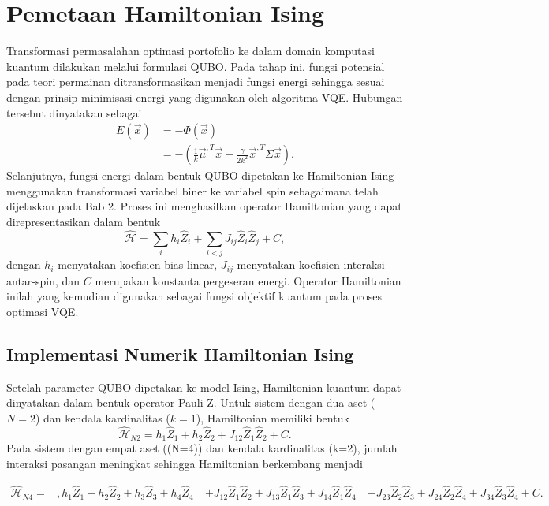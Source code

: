 \section{Pemetaan Hamiltonian Ising}
\label{sec:4_3_pemetaan_hamiltonian}
Transformasi permasalahan optimasi portofolio ke dalam domain komputasi kuantum dilakukan melalui formulasi QUBO. Pada tahap ini, fungsi potensial pada teori permainan ditransformasikan menjadi fungsi energi sehingga sesuai dengan prinsip minimisasi energi yang digunakan oleh algoritma VQE. Hubungan tersebut dinyatakan sebagai
\begin{equation}
\begin{split}
E(\vec{x})
&=
-\Phi(\vec{x}) \\
&=
-
\left(
\frac{1}{k}\vec{\mu}^{,T}\vec{x}
-
\frac{\gamma}{2k^2}
\vec{x}^{,T}\Sigma\vec{x}
\right).
\label{eq:energy_function}
\end{split}
\end{equation}
Selanjutnya, fungsi energi dalam bentuk QUBO dipetakan ke Hamiltonian Ising menggunakan transformasi variabel biner ke variabel spin sebagaimana telah dijelaskan pada Bab 2. Proses ini menghasilkan operator Hamiltonian yang dapat direpresentasikan dalam bentuk
\begin{equation}
\hat{\mathcal H}
=
\sum_i h_i \hat Z_i
+
\sum_{i<j} J_{ij}\hat Z_i\hat Z_j
+
C,
\end{equation}
dengan \(h_i\) menyatakan koefisien bias linear, \(J_{ij}\) menyatakan koefisien interaksi antar-spin, dan \(C\) merupakan konstanta pergeseran energi. Operator Hamiltonian inilah yang kemudian digunakan sebagai fungsi objektif kuantum pada proses optimasi VQE.

\subsection{Implementasi Numerik Hamiltonian Ising}
Setelah parameter QUBO dipetakan ke model Ising, Hamiltonian kuantum dapat dinyatakan dalam bentuk operator Pauli-Z. Untuk sistem dengan dua aset (\(N=2\)) dan kendala kardinalitas (\(k=1\)), Hamiltonian memiliki bentuk
\begin{equation}
\hat{\mathcal{H}}_{N2}
=
h_1 \hat{Z}_1
+
h_2 \hat{Z}_2
+
J_{12}\hat{Z}_1\hat{Z}_2
+
C.
\end{equation}
Pada sistem dengan empat aset ((N=4)) dan kendala kardinalitas (k=2), jumlah interaksi pasangan meningkat sehingga Hamiltonian berkembang menjadi

\begin{equation}
\begin{split}
\hat{\mathcal{H}}_{N4}
=&,
h_1 \hat{Z}_1
+
h_2 \hat{Z}_2
+
h_3 \hat{Z}_3
+
h_4 \hat{Z}_4 \
&
+
J_{12}\hat{Z}_1\hat{Z}_2
+
J_{13}\hat{Z}_1\hat{Z}_3
+
J_{14}\hat{Z}_1\hat{Z}_4 \
&
+
J_{23}\hat{Z}_2\hat{Z}_3
+
J_{24}\hat{Z}_2\hat{Z}_4
+
J_{34}\hat{Z}_3\hat{Z}_4
+
C.
\end{split}
\end{equation}

